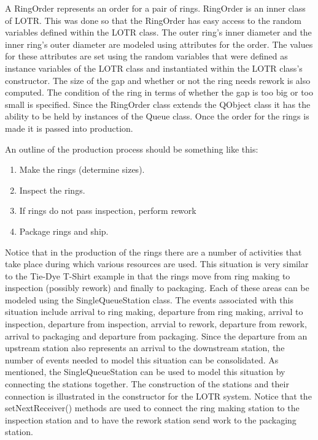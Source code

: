 \documentclass[
]{book}
\theoremstyle{definition}
\theoremstyle{definition}
\theoremstyle{definition}
\theoremstyle{definition}
\theoremstyle{remark}
\begin{document}
A RingOrder represents an order for a pair of rings.
RingOrder is an inner class of LOTR. This was done so that the RingOrder
has easy access to the random variables defined within the LOTR class.
The outer ring's inner diameter and the inner ring's outer diameter are
modeled using attributes for the order. The values for these attributes
are set using the random variables that were defined as instance
variables of the LOTR class and instantiated within the LOTR class's
constructor. The size of the gap and whether or not the ring needs
rework is also computed. The condition of the ring in terms of whether
the gap is too big or too small is specified. Since the RingOrder class
extends the QObject class it has the ability to be held by instances of
the Queue class. Once the order for the rings is made it is passed into
production.

An outline of the production process should be something like this:

\begin{enumerate}
\def\labelenumi{\arabic{enumi}.}
\item
  Make the rings (determine sizes).
\item
  Inspect the rings.
\item
  If rings do not pass inspection, perform rework
\item
  Package rings and ship.
\end{enumerate}

Notice that in the production of the rings there are a number of
activities that take place during which various resources are used. This
situation is very similar to the Tie-Dye T-Shirt example in that the
rings move from ring making to inspection (possibly rework) and finally
to packaging. Each of these areas can be modeled using the
SingleQueueStation class. The
events associated with this situation include arrival to ring making,
departure from ring making, arrival to inspection, departure from
inspection, arrvial to rework, departure from rework, arrival to
packaging and departure from packaging. Since the departure from an
upstream station also represents an arrival to the downstream station,
the number of events needed to model this situation can be consolidated.
As mentioned, the SingleQueueStation can be used to model this situation
by connecting the stations together. The construction of the stations
and their connection is illustrated in the constructor for the LOTR system. Notice that the setNextReceiver() methods
are used to connect the ring making station to the inspection station
and to have the rework station send work to the packaging station.
\end{document}
